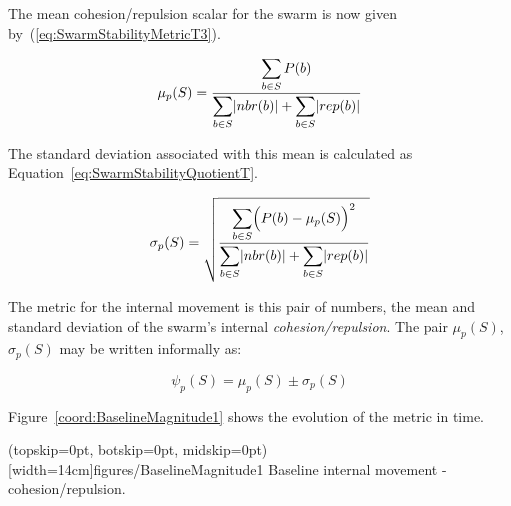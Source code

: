 \documentclass{ieeeaccess}
\begin{document}
The mean cohesion/repulsion scalar for the swarm is now given by~(\ref{eq:SwarmStabilityMetricT3}).  

\begin{equation}
\label{eq:SwarmStabilityMetricT3}
\mu_p(S) = \frac{\mathlarger{\sum_{b \in S} P(b)}}{\mathlarger{\sum_{b \in S}}|nbr(b)| + \mathlarger{\sum_{b \in S}}|rep(b)|}
\end{equation}


The standard deviation associated with this mean is calculated as Equation~\ref{eq:SwarmStabilityQuotientT}.

\begin{equation}
\label{eq:SwarmStabilityQuotientT}
\sigma_p(S) = \sqrt{\frac{\mathlarger{\sum_{b \in S}}\Big(P(b)-\mu_p(S)\Big)^2}{\mathlarger{\sum_{b \in S}}|nbr(b)| + \mathlarger{\sum_{b \in S}}|rep(b)|}}
\end{equation}

The metric for the internal movement is this pair of numbers, the mean and standard deviation of the swarm's internal \textit{cohesion/repulsion}. The pair $\mu_p(S)$, $\sigma_p(S)$ may be written informally as: 

\begin{equation}
\label{eq:SwarmPotentialMagnitude}
\psi_p(S) = \mu_p(S)\pm \sigma_p(S)
\end{equation}

Figure~\ref{coord:BaselineMagnitude1} shows the evolution of the metric in time.

\Figure[t!](topskip=0pt, botskip=0pt, midskip=0pt)[width=14cm]{figures/BaselineMagnitude1}
{Baseline internal movement - cohesion/repulsion.\label{coord:BaselineMagnitude1}}

\end{document}
